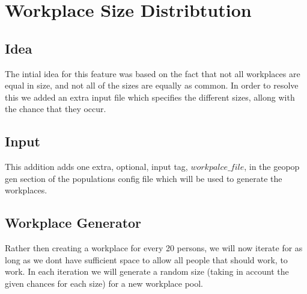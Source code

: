 
\section{Workplace Size Distribtution}
\label{section:WorkplaceSizeDistribution}

\subsection{Idea}
The intial idea for this feature was based on the fact that not all workplaces are equal in size, and not all of the sizes are equally as common. In order to resolve this we added an extra input file which specifies the different sizes, allong with the chance that they occur.

\subsection{Input}
This addition adds one extra, optional, input tag, $workpalce\_file$, in the geopop gen section of the populations config file which will be used to generate the workplaces.

\subsection{Workplace Generator}
Rather then creating a workplace for every 20 persons, we will now iterate for as long as we dont have sufficient space to allow all people that should work, to work. In each iteration we will generate a random size (taking in account the given chances for each size) for a new workplace pool.
